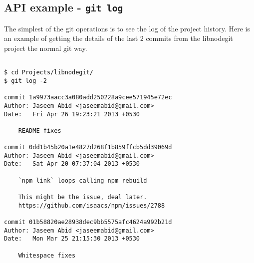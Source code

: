 \subsection{API example - \texttt{git log}}

The simplest of the git operations is to see the log of the project history.
Here is an example of getting the details of the last 2 commits from the
libnodegit project the normal git way.

\begin{verbatim}

$ cd Projects/libnodegit/
$ git log -2

commit 1a9973aacc3a080add250228a9cee571945e72ec
Author: Jaseem Abid <jaseemabid@gmail.com>
Date:   Fri Apr 26 19:23:21 2013 +0530

    README fixes

commit 0dd1b45b20a1e4827d268f1b859ffcb5dd39069d
Author: Jaseem Abid <jaseemabid@gmail.com>
Date:   Sat Apr 20 07:37:04 2013 +0530

    `npm link` loops calling npm rebuild

    This might be the issue, deal later.
    https://github.com/isaacs/npm/issues/2788

commit 01b58820ae28938dec9bb5575afc4624a992b21d
Author: Jaseem Abid <jaseemabid@gmail.com>
Date:   Mon Mar 25 21:15:30 2013 +0530

    Whitespace fixes

\end{verbatim}
